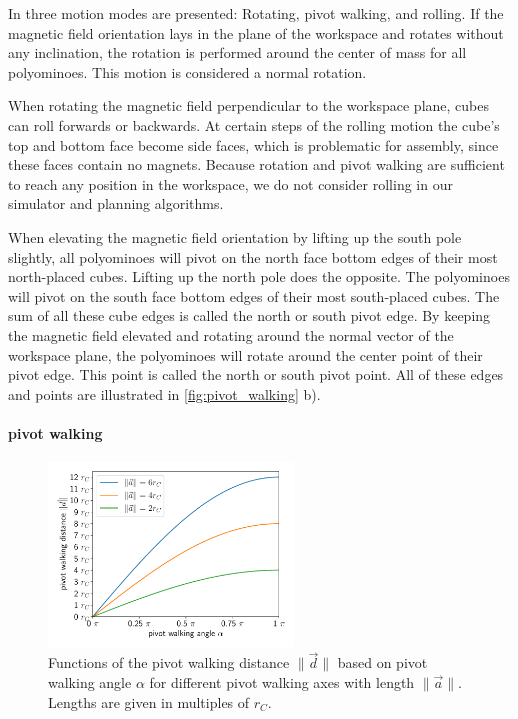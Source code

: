 In \cite{Bhattacharjee2022} three motion modes are presented: Rotating, pivot walking, and rolling.
If the magnetic field orientation lays in the plane of the workspace and rotates without any inclination, the rotation is performed around the center of mass for all polyominoes.
This motion is considered a normal rotation.

When rotating the magnetic field perpendicular to the workspace plane, cubes can roll forwards or backwards.
At certain steps of the rolling motion the cube's top and bottom face become side faces, which is problematic for assembly, since these faces contain no magnets.
Because rotation and pivot walking are sufficient to reach any position in the workspace, we do not consider rolling in our simulator and planning algorithms.

\newpage

When elevating the magnetic field orientation by lifting up the south pole slightly, all polyominoes will pivot on the north face bottom edges of their most north-placed cubes.
Lifting up the north pole does the opposite. The polyominoes will pivot on the south face bottom edges of their most south-placed cubes.
The sum of all these cube edges is called the north or south pivot edge.
By keeping the magnetic field elevated and rotating around the normal vector of the workspace plane, the polyominoes will rotate around the center point of their pivot edge.
This point is called the north or south pivot point.
All of these edges and points are illustrated in \autoref{fig:pivot_walking} b).


\paragraph{pivot walking}

\begin{figure}
	\centering
	\includegraphics[width=0.58\textwidth]{figures/plots/pivot_walking_angle.pdf}
	\caption[Functions of $\lVert \vec{d} \rVert$ based on $\alpha$ for different $\lVert \vec{a} \rVert$]{Functions of the pivot walking distance $\lVert \vec{d} \rVert$ based on pivot walking angle $\alpha$ for different pivot walking axes with length $\lVert \vec{a} \rVert$. Lengths are given in multiples of $r_C$.}
	\label{fig:pw_angle_plot}
\end{figure}

